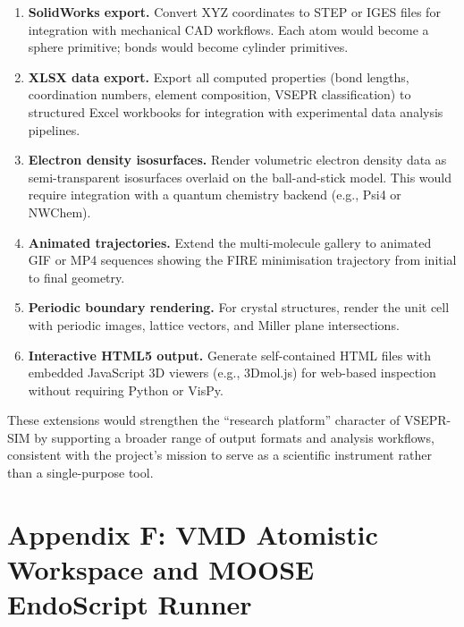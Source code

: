 \documentclass[11pt,a4paper]{article}
\begin{document}
\begin{enumerate}
  \item \textbf{SolidWorks export.}  Convert XYZ coordinates to STEP
        or IGES files for integration with mechanical CAD workflows.
        Each atom would become a sphere primitive; bonds would become
        cylinder primitives.

  \item \textbf{XLSX data export.}  Export all computed properties
        (bond lengths, coordination numbers, element composition, VSEPR
        classification) to structured Excel workbooks for integration
        with experimental data analysis pipelines.

  \item \textbf{Electron density isosurfaces.}  Render volumetric
        electron density data as semi-transparent isosurfaces overlaid
        on the ball-and-stick model.  This would require integration
        with a quantum chemistry backend (e.g., Psi4 or NWChem).

  \item \textbf{Animated trajectories.}  Extend the multi-molecule
        gallery to animated GIF or MP4 sequences showing the FIRE
        minimisation trajectory from initial to final geometry.

  \item \textbf{Periodic boundary rendering.}  For crystal structures,
        render the unit cell with periodic images, lattice vectors,
        and Miller plane intersections.

  \item \textbf{Interactive HTML5 output.}  Generate self-contained
        HTML files with embedded JavaScript 3D viewers (e.g., 3Dmol.js)
        for web-based inspection without requiring Python or VisPy.
\end{enumerate}

\noindent These extensions would strengthen the ``research platform''
character of VSEPR-SIM by supporting a broader range of output formats
and analysis workflows, consistent with the project's mission to serve
as a scientific instrument rather than a single-purpose tool.

\section{Appendix F: VMD Atomistic Workspace and MOOSE EndoScript Runner}
\label{sec:appendix_vmd_moose}
\end{document}
